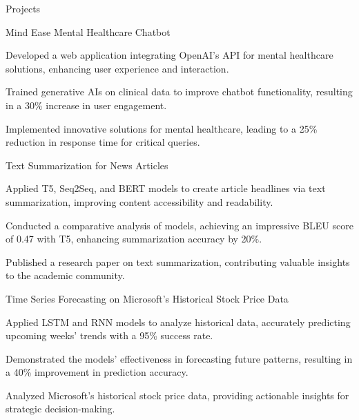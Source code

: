 \documentclass{resume} %
\begin{document}
    \begin{rSection}{Projects}
                    \begin{rSubsection}
                                    {Mind Ease Mental Healthcare Chatbot}
                                {}{}{}
                                    \item Developed a web application integrating OpenAI's API for mental healthcare solutions, enhancing user experience and interaction.
                                    \item Trained generative AIs on clinical data to improve chatbot functionality, resulting in a 30\% increase in user engagement.
                                    \item Implemented innovative solutions for mental healthcare, leading to a 25\% reduction in response time for critical queries.
                            \end{rSubsection}
                    \begin{rSubsection}
                                    {Text Summarization for News Articles}
                                {}{}{}
                                    \item Applied T5, Seq2Seq, and BERT models to create article headlines via text summarization, improving content accessibility and readability.
                                    \item Conducted a comparative analysis of models, achieving an impressive BLEU score of 0.47 with T5, enhancing summarization accuracy by 20\%.
                                    \item Published a research paper on text summarization, contributing valuable insights to the academic community.
                            \end{rSubsection}
                    \begin{rSubsection}
                                    {Time Series Forecasting on Microsoft's Historical Stock Price Data}
                                {}{}{}
                                    \item Applied LSTM and RNN models to analyze historical data, accurately predicting upcoming weeks' trends with a 95\% success rate.
                                    \item Demonstrated the models' effectiveness in forecasting future patterns, resulting in a 40\% improvement in prediction accuracy.
                                    \item Analyzed Microsoft's historical stock price data, providing actionable insights for strategic decision{-}making.
                            \end{rSubsection}
            \end{rSection}
\end{document}
